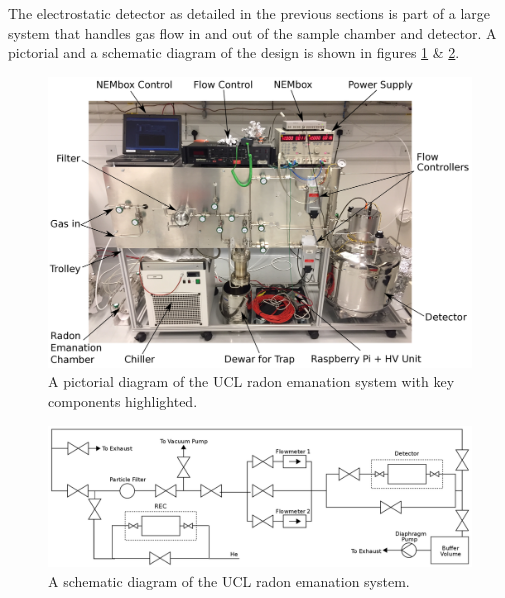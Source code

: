 The electrostatic detector as detailed in the previous sections is part of a large system that handles gas flow in and out of the sample chamber and detector. A pictorial and a schematic diagram of the design is shown in figures \ref{fig:detector_design_picture} \& \ref{fig:detector_design_schematic}.
%
\begin{figure}[]
    \centering
    \includegraphics[scale=0.4]{Chapter_4/Figures/radon_system_design.png}
    \caption[A pictorial diagram of the UCL radon emanation system with key components highlighted.]
    {A pictorial diagram of the UCL radon emanation system with key components highlighted.}
    \label{fig:detector_design_picture}
\end{figure}
%
%
\begin{figure}[]
    \centering
    \includegraphics[scale=0.38]{Chapter_4/Figures/radon_system_pid.png}
    \caption[A schematic diagram of the UCL radon emanation system.]
    {A schematic diagram of the UCL radon emanation system.}
    \label{fig:detector_design_schematic}
\end{figure}
%

